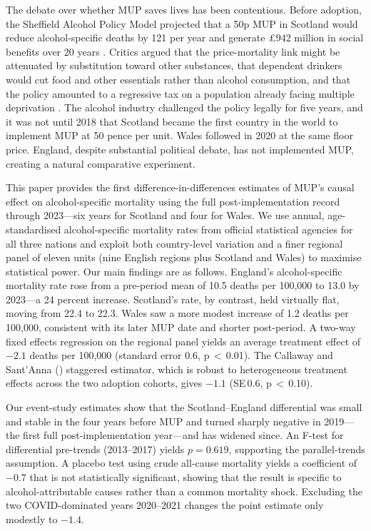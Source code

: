 \documentclass[12pt]{article}
\begin{document}
The debate over whether MUP saves lives has been contentious. Before adoption, the Sheffield Alcohol Policy Model projected that a 50p MUP in Scotland would reduce alcohol-specific deaths by 121 per year and generate £942 million in social benefits over 20 years \citep{Holmes2014}. Critics argued that the price-mortality link might be attenuated by substitution toward other substances, that dependent drinkers would cut food and other essentials rather than alcohol consumption, and that the policy amounted to a regressive tax on a population already facing multiple deprivation \citep{Anderson2012}. The alcohol industry challenged the policy legally for five years, and it was not until 2018 that Scotland became the first country in the world to implement MUP at 50 pence per unit. Wales followed in 2020 at the same floor price. England, despite substantial political debate, has not implemented MUP, creating a natural comparative experiment.

This paper provides the first difference-in-differences estimates of MUP's causal effect on alcohol-specific mortality using the full post-implementation record through 2023---six years for Scotland and four for Wales. We use annual, age-standardised alcohol-specific mortality rates from official statistical agencies for all three nations and exploit both country-level variation and a finer regional panel of eleven units (nine English regions plus Scotland and Wales) to maximise statistical power. Our main findings are as follows. England's alcohol-specific mortality rate rose from a pre-period mean of 10.5 deaths per 100,000 to 13.0 by 2023---a 24 percent increase. Scotland's rate, by contrast, held virtually flat, moving from 22.4 to 22.3. Wales saw a more modest increase of 1.2 deaths per 100,000, consistent with its later MUP date and shorter post-period. A two-way fixed effects regression on the regional panel yields an average treatment effect of $-2.1$ deaths per 100,000 (standard error 0.6, p\,$<$\,0.01). The Callaway and Sant'Anna (\citeyear{Callaway2021}) staggered estimator, which is robust to heterogeneous treatment effects across the two adoption cohorts, gives $-1.1$ (SE\,0.6, p\,$<$\,0.10).

Our event-study estimates show that the Scotland--England differential was small and stable in the four years before MUP and turned sharply negative in 2019---the first full post-implementation year---and has widened since. An F-test for differential pre-trends (2013--2017) yields $p = 0.619$, supporting the parallel-trends assumption. A placebo test using crude all-cause mortality yields a coefficient of $-0.7$ that is not statistically significant, showing that the result is specific to alcohol-attributable causes rather than a common mortality shock. Excluding the two COVID-dominated years 2020--2021 changes the point estimate only modestly to $-1.4$.
\end{document}
